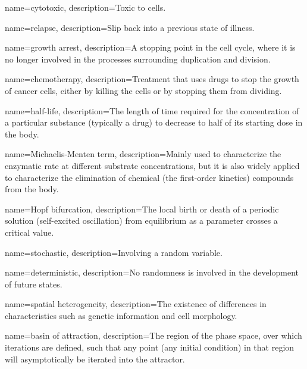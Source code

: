 

{
name=cytotoxic,
description={Toxic to cells.}
}

{
name=relapse,
description={Slip back into a previous state of illness.}
}

{
name=growth arrest,
description={A stopping point in the cell cycle, where it is no longer involved in the processes surrounding duplication and division.}
}

{
name=chemotherapy,
description={Treatment that uses drugs to stop the growth of cancer cells, either by killing the cells or by stopping them from dividing.}
}

{
name=half-life,
description={The length of time required for the concentration of a particular substance (typically a drug) to decrease to half of its starting dose in the body.}
}

{
name=Michaelis-Menten term,
description={Mainly used to characterize the enzymatic rate at different substrate concentrations, but it is also widely applied to characterize the elimination of chemical (the first-order kinetics) compounds from the body.}
}

{
name=Hopf bifurcation,
description={The local birth or death of a periodic solution (self-excited oscillation) from equilibrium as a parameter crosses a critical value.}
}

{
name=stochastic,
description={Involving a random variable.}
}

{
name=deterministic,
description={No randomness is involved in the development of future states.}
}

{
name=spatial heterogeneity,
description={The existence of differences in characteristics such as genetic information and cell morphology.}
}

{
name=basin of attraction,
description={The region of the phase space, over which iterations are defined, such that any point (any initial condition) in that region will asymptotically be iterated into the attractor.}
}

